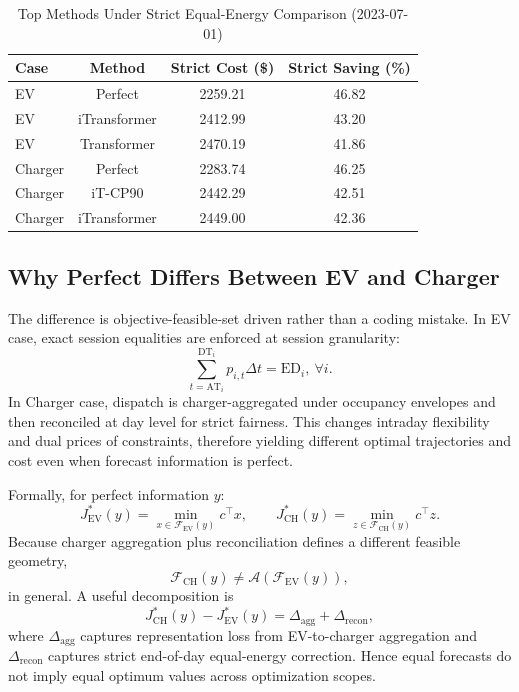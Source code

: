 \documentclass[journal]{IEEEtran}
\newcommand{\AT}{\mathrm{AT}}
\newcommand{\DT}{\mathrm{DT}}
\newcommand{\ED}{\mathrm{ED}}
\begin{document}
\begin{table}[t]
\caption{Top Methods Under Strict Equal-Energy Comparison (2023-07-01)}
\centering
\begin{tabular}{lccc}
\toprule
Case & Method & Strict Cost (\$) & Strict Saving (\%) \\
\midrule
EV & Perfect & 2259.21 & 46.82 \\
EV & iTransformer & 2412.99 & 43.20 \\
EV & Transformer & 2470.19 & 41.86 \\
Charger & Perfect & 2283.74 & 46.25 \\
Charger & iT-CP90 & 2442.29 & 42.51 \\
Charger & iTransformer & 2449.00 & 42.36 \\
\bottomrule
\end{tabular}
\label{tab:strict_top}
\end{table}

\subsection{Why Perfect Differs Between EV and Charger}
The difference is objective-feasible-set driven rather than a coding mistake. In EV case, exact session equalities are enforced at session granularity:
\begin{equation}
\sum_{t=\AT_i}^{\DT_i}p_{i,t}\Delta t = \ED_i,\ \forall i.
\end{equation}
In Charger case, dispatch is charger-aggregated under occupancy envelopes and then reconciled at day level for strict fairness. This changes intraday flexibility and dual prices of constraints, therefore yielding different optimal trajectories and cost even when forecast information is perfect.

Formally, for perfect information $y$:
\begin{equation}
J^*_{\mathrm{EV}}(y)=\min_{x\in\mathcal{F}_{\mathrm{EV}}(y)} c^\top x,
\qquad
J^*_{\mathrm{CH}}(y)=\min_{z\in\mathcal{F}_{\mathrm{CH}}(y)} c^\top z.
\end{equation}
Because charger aggregation plus reconciliation defines a different feasible geometry,
\begin{equation}
\mathcal{F}_{\mathrm{CH}}(y)\neq \mathcal{A}(\mathcal{F}_{\mathrm{EV}}(y)),
\end{equation}
in general. A useful decomposition is
\begin{equation}
J^*_{\mathrm{CH}}(y)-J^*_{\mathrm{EV}}(y)=\Delta_{\mathrm{agg}}+\Delta_{\mathrm{recon}},
\end{equation}
where $\Delta_{\mathrm{agg}}$ captures representation loss from EV-to-charger aggregation and $\Delta_{\mathrm{recon}}$ captures strict end-of-day equal-energy correction. Hence equal forecasts do not imply equal optimum values across optimization scopes.
\end{document}

